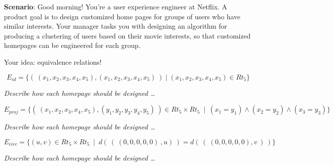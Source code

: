 
{\bf Scenario}: Good morning! You're a user experience engineer at Netflix. A
product goal is to design customized home pages for groups of users who have
similar interests. Your manager tasks you with designing an algorithm for
producing a clustering of users based on their movie interests,
so that customized homepages can be engineered for each group.


Your idea: equivalence relations! 

\[
    E_{id} = \{ ( ~(x_1, x_2, x_3, x_4, x_5), (x_1, x_2, x_3, x_4, x_5)~) \mid 
    (x_1, x_2, x_3, x_4, x_5) \in Rt_5  \}
\]

{\it Describe how each homepage should be designed \ldots }

\vspace{100pt}



\[
    E_{proj} =  \{ ( ~(x_1, x_2, x_3, x_4, x_5), (y_1, y_2, y_3, y_4, y_5)~) \in
         Rt_5 \times Rt_5 ~\mid~(x_1 = y_1) \land  (x_2 = y_2) \land (x_3 = y_3) \}
\]


{\it Describe how each homepage should be designed \ldots }

\vspace{100pt}

\[
E_{circ} =  \{ (u,v) \in Rt_5 \times Rt_5 ~\mid~ d(~ ( ~(0,0,0,0,0)~, u)~ ) =  d( ~(~(0,0,0,0,0),v~)~) \}
\]

{\it Describe how each homepage should be designed \ldots }


\vspace{100pt}





